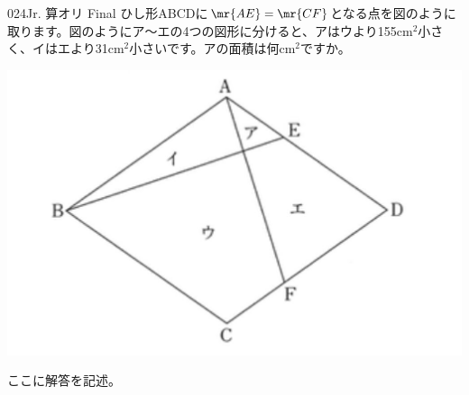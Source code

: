\begin{thm}{024}{}{Jr. 算オリ Final}
 ひし形ABCDに$\mr{AE}=\mr{CF}$となる点を図のように取ります。図のようにア～エの4つの図形に分けると、アはウより155cm${}^2$小さく、イはエより31cm${}^2$小さいです。アの面積は何cm${}^2$ですか。
 \begin{center}
  \includegraphics[bb=0 0 1013 637,width=0.7\linewidth]{../problems/Q_024/Q_024.jpg}
 \end{center}
\end{thm}

ここに解答を記述。
